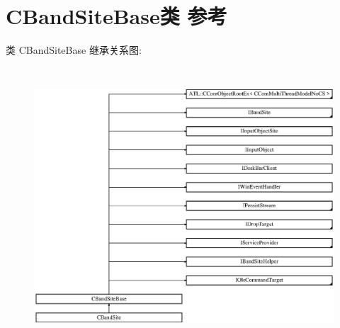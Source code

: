 \hypertarget{class_c_band_site_base}{}\section{C\+Band\+Site\+Base类 参考}
\label{class_c_band_site_base}
类 C\+Band\+Site\+Base 继承关系图\+:\begin{figure}[H]
\begin{center}
\leavevmode
\includegraphics[height=10.340908cm]{class_c_band_site_base}
\end{center}
\end{figure}
